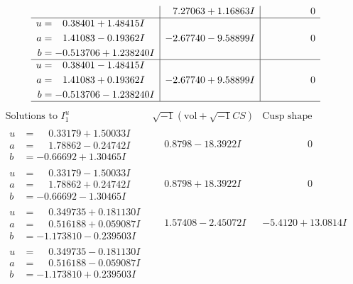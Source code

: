 \documentclass[1p]{elsarticle_modified}
\theoremstyle{definition}
\newcommand{\I}{\sqrt{-1}}
\begin{document}
$$\begin{array}{c|c|c}
 & \phantom{-}7.27063 + 1.16863 I & \phantom{-0.000000 } 0 \\ \hline\begin{aligned}
u &= \phantom{-}0.38401 + 1.48415 I \\
a &= \phantom{-}1.41083 - 0.19362 I \\
b &= -0.513706 + 1.238240 I\end{aligned}
 & -2.67740 - 9.58899 I & \phantom{-0.000000 } 0 \\ \hline\begin{aligned}
u &= \phantom{-}0.38401 - 1.48415 I \\
a &= \phantom{-}1.41083 + 0.19362 I \\
b &= -0.513706 - 1.238240 I\end{aligned}
 & -2.67740 + 9.58899 I & \phantom{-0.000000 } 0\\
 \hline 
 \end{array}$$\newpage$$\begin{array}{c|c|c}  
\text{Solutions to }I^u_{1}& \I (\text{vol} + \sqrt{-1}CS) & \text{Cusp shape}\\
 \hline 
\begin{aligned}
u &= \phantom{-}0.33179 + 1.50033 I \\
a &= \phantom{-}1.78862 - 0.24742 I \\
b &= -0.66692 + 1.30465 I\end{aligned}
 & \phantom{-}0.8798 - 18.3922 I & \phantom{-0.000000 } 0 \\ \hline\begin{aligned}
u &= \phantom{-}0.33179 - 1.50033 I \\
a &= \phantom{-}1.78862 + 0.24742 I \\
b &= -0.66692 - 1.30465 I\end{aligned}
 & \phantom{-}0.8798 + 18.3922 I & \phantom{-0.000000 } 0 \\ \hline\begin{aligned}
u &= \phantom{-}0.349735 + 0.181130 I \\
a &= \phantom{-}0.516188 + 0.059087 I \\
b &= -1.173810 - 0.239503 I\end{aligned}
 & \phantom{-}1.57408 - 2.45072 I & -5.4120 + 13.0814 I \\ \hline\begin{aligned}
u &= \phantom{-}0.349735 - 0.181130 I \\
a &= \phantom{-}0.516188 - 0.059087 I \\
b &= -1.173810 + 0.239503 I\end{aligned}

\end{array}$$
\end{document}

